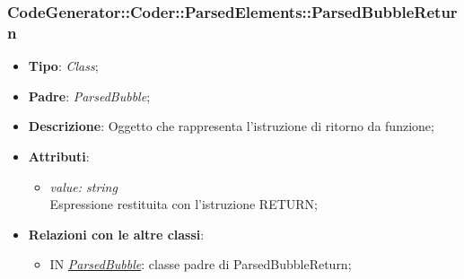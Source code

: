 \documentclass[../DefinizioneDiProdotto.tex]{subfiles}
\begin{document}
				\subsubsection{CodeGenerator::Coder::ParsedElements::ParsedBubbleReturn}
			\hypertarget{SWEDesigner::Server::CodeGenerator::Coder::ParsedElements::ParsedBubbleReturn}{}
			\begin{itemize}
				\item \textbf{Tipo}: \emph{Class};
				\item \textbf{Padre}: \emph{ParsedBubble};
				\item \textbf{Descrizione}: Oggetto che rappresenta l'istruzione di ritorno da funzione;
				\item \textbf{Attributi}:
				\begin{itemize}
					\item \emph{value: string} \\
					Espressione restituita con l'istruzione RETURN;
				\end{itemize}
				\item \textbf{Relazioni con le altre classi}:	
				\begin{itemize}
					\item IN \hyperlink{SWEDesigner::Server::CodeGenerator::Coder::ParsedElements::ParsedBubble}{\emph{ParsedBubble}}: classe padre di ParsedBubbleReturn; 
				\end{itemize}
			\end{itemize}
		
\end{document}
